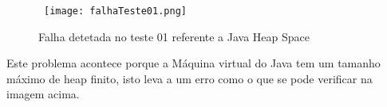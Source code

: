 \begin{figure}[H]

  \centering

  \hbox{\hspace{-8em} \texttt{[image: falhaTeste01.png]}}

  \caption {Falha detetada no teste 01 referente a Java Heap Space}

  \label {fig44}

\end{figure}

\par Este problema acontece porque a Máquina virtual do Java tem um tamanho máximo de heap finito, isto leva a um erro como o que se pode verificar na imagem acima.










